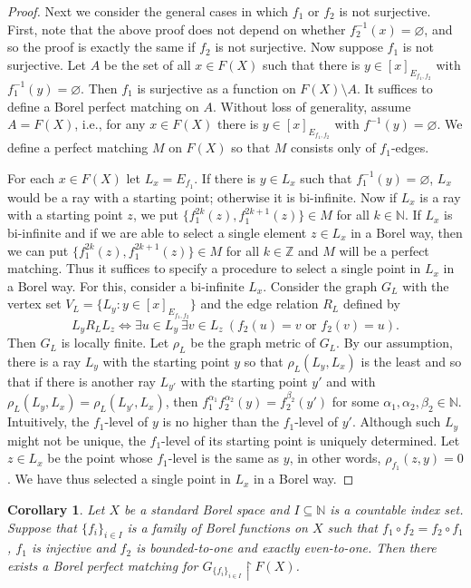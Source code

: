 \documentclass[11pt, reqno, a4paper]{amsart}
\newtheorem{corollary}[theorem]{Corollary}
\theoremstyle{definition}
\theoremstyle{plain}
\begin{document}
\begin{proof}
Next we consider the general cases in which $f_1$ or $f_2$ is not surjective. First, note that the above proof does not depend on whether $f_2^{-1}(x)=\varnothing$, and so the proof is exactly the same if $f_2$ is not surjective. 
Now suppose $f_1$ is not surjective. Let $A$ be the set of all $x\in F(X)$ such that there is $y\in [x]_{E_{f_1, f_2}}$ with $f_1^{-1}(y)=\varnothing$. Then $f_1$ is surjective as a function on $F(X)\setminus A$. It suffices to define a Borel perfect matching on $A$. Without loss of generality, assume $A=F(X)$, i.e., for any $x\in F(X)$ there is $y\in [x]_{E_{f_1,f_2}}$ with $f^{-1}(y)=\varnothing$. We define a perfect matching $M$ on $F(X)$ so that $M$ consists only of $f_1$-edges. 

For each $x\in F(X)$ let $L_x=E_{f_1}$. If there is $y\in L_x$ such that $f_1^{-1}(y)=\varnothing$, $L_x$ would be a ray with a starting point; otherwise it is bi-infinite. Now if $L_x$ is a ray with a starting point $z$, we put $\{f_1^{2k}(z), f_1^{2k+1}(z)\}\in M$ for all $k\in\mathbb{N}$. If $L_x$ is bi-infinite and if we are able to select a single element $z\in L_x$ in a Borel way, then we can put $\{f_1^{2k}(z), f_1^{2k+1}(z)\}\in M$ for all $k\in\mathbb{Z}$ and $M$ will be a perfect matching. Thus it suffices to specify a procedure to select a single point in $L_x$ in a Borel way. For this, consider a bi-infinite $L_x$. Consider the graph $G_L$ with the vertex set $V_L=\{L_y\colon y\in [x]_{E_{f_1,f_2}}\}$ and the edge relation $R_L$ defined by
$$ L_yR_LL_z\iff \exists u\in L_y\ \exists v\in L_z\ (f_2(u)=v \mbox{ or } f_2(v)=u). $$
Then $G_L$ is locally finite. Let $\rho_L$ be the graph metric of $G_L$. By our assumption, there is a ray $L_y$ with the starting point $y$ so that $\rho_{L}(L_y, L_x)$ is the least and so that if there is another ray $L_{y'}$ with the starting point $y'$ and with $\rho_{L}(L_y, L_x)=\rho_{L}(L_{y'}, L_x)$, then $f_1^{\alpha_1}f_2^{\alpha_2}(y)=f_2^{\beta_2}(y')$ for some $\alpha_1, \alpha_2, \beta_2\in\mathbb{N}$. Intuitively, the $f_1$-level of $y$ is no higher than the $f_1$-level of $y'$. Although such $L_y$ might not be unique, the $f_1$-level of its starting point is uniquely determined. Let $z\in L_x$ be the point whose $f_1$-level is the same as $y$, in other words, $\rho_{f_1}(z, y)=0$. We have thus selected a single point in $L_x$ in a Borel way.
\end{proof}


\begin{corollary} Let $X$ be a standard Borel space and $I\subseteq \mathbb{N}$ is a countable index set.
Suppose that $\{f_i\}_{i\in I}$ is a family of Borel functions on $X$ such that $f_1\circ f_2=f_2\circ f_1$, $f_1$ is injective and $f_2$ is bounded-to-one and exactly even-to-one. Then there exists a Borel perfect matching for $G_{\{f_i\}_{i\in I}}\upharpoonright F(X)$.
\end{corollary}
\end{document}
